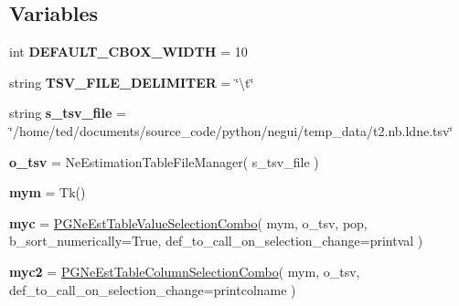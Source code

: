 \subsection*{Variables}
\begin{DoxyCompactItemize}
\item 
int {\bfseries D\+E\+F\+A\+U\+L\+T\+\_\+\+C\+B\+O\+X\+\_\+\+W\+I\+D\+TH} = 10\hypertarget{namespacenegui_1_1pgneestimationtableselectioncombo_a7a7c54845d195db816acb5b670114314}{}\label{namespacenegui_1_1pgneestimationtableselectioncombo_a7a7c54845d195db816acb5b670114314}

\item 
string {\bfseries T\+S\+V\+\_\+\+F\+I\+L\+E\+\_\+\+D\+E\+L\+I\+M\+I\+T\+ER} = \char`\"{}\textbackslash{}t\char`\"{}\hypertarget{namespacenegui_1_1pgneestimationtableselectioncombo_a4544819f3beb234e7d38ee2579b0aa5f}{}\label{namespacenegui_1_1pgneestimationtableselectioncombo_a4544819f3beb234e7d38ee2579b0aa5f}

\item 
string {\bfseries s\+\_\+tsv\+\_\+file} = \char`\"{}/home/ted/documents/source\+\_\+code/python/negui/temp\+\_\+data/t2.\+nb.\+ldne.\+tsv\char`\"{}\hypertarget{namespacenegui_1_1pgneestimationtableselectioncombo_a3d7d3a64fdf14016081792630c2e110c}{}\label{namespacenegui_1_1pgneestimationtableselectioncombo_a3d7d3a64fdf14016081792630c2e110c}

\item 
{\bfseries o\+\_\+tsv} = Ne\+Estimation\+Table\+File\+Manager( s\+\_\+tsv\+\_\+file )\hypertarget{namespacenegui_1_1pgneestimationtableselectioncombo_a8635d092ea6c53050bb1e0e7156b65ec}{}\label{namespacenegui_1_1pgneestimationtableselectioncombo_a8635d092ea6c53050bb1e0e7156b65ec}

\item 
{\bfseries mym} = Tk()\hypertarget{namespacenegui_1_1pgneestimationtableselectioncombo_a64a50fa478786d2e7081bede9d363a1c}{}\label{namespacenegui_1_1pgneestimationtableselectioncombo_a64a50fa478786d2e7081bede9d363a1c}

\item 
{\bfseries myc} = \hyperlink{classnegui_1_1pgneestimationtableselectioncombo_1_1PGNeEstTableValueSelectionCombo}{P\+G\+Ne\+Est\+Table\+Value\+Selection\+Combo}( mym, o\+\_\+tsv, \textquotesingle{}pop\textquotesingle{}, b\+\_\+sort\+\_\+numerically=True, def\+\_\+to\+\_\+call\+\_\+on\+\_\+selection\+\_\+change=printval )\hypertarget{namespacenegui_1_1pgneestimationtableselectioncombo_afa656478f0a9bdb22e8fe7108090288e}{}\label{namespacenegui_1_1pgneestimationtableselectioncombo_afa656478f0a9bdb22e8fe7108090288e}

\item 
{\bfseries myc2} = \hyperlink{classnegui_1_1pgneestimationtableselectioncombo_1_1PGNeEstTableColumnSelectionCombo}{P\+G\+Ne\+Est\+Table\+Column\+Selection\+Combo}( mym, o\+\_\+tsv, def\+\_\+to\+\_\+call\+\_\+on\+\_\+selection\+\_\+change=printcolname )\hypertarget{namespacenegui_1_1pgneestimationtableselectioncombo_af4da54456e2ae8d321354d72b68001f2}{}\label{namespacenegui_1_1pgneestimationtableselectioncombo_af4da54456e2ae8d321354d72b68001f2}

\end{DoxyCompactItemize}


